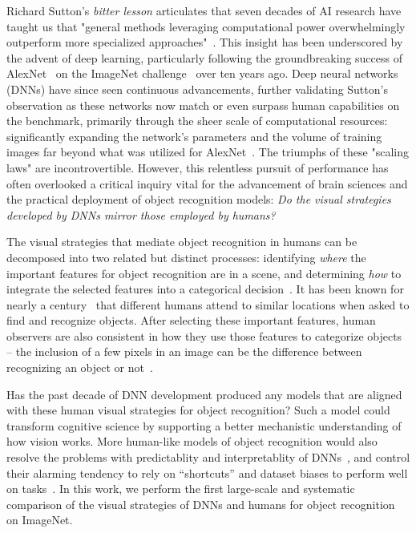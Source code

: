 


Richard Sutton's \textit{bitter lesson} articulates that seven decades of AI research have taught us that "general methods leveraging computational power overwhelmingly outperform more specialized approaches"~\cite{Sutton2019-vf}. This insight has been underscored by the advent of deep learning, particularly following the groundbreaking success of AlexNet~\cite{krizhevsky2012imagenet} on the ImageNet challenge~\cite{imagenet_cvpr09} over ten years ago. Deep neural networks (DNNs) have since seen continuous advancements, further validating Sutton's observation as these networks now match or even surpass human capabilities on the benchmark, primarily through the sheer scale of computational resources: significantly expanding the network's parameters and the volume of training images far beyond what was utilized for AlexNet~\cite{Liu2022-es,Zhai2021-al,Kaplan2020-zx}. The triumphs of these "scaling laws" are incontrovertible. However, this relentless pursuit of performance has often overlooked a critical inquiry vital for the advancement of brain sciences and the practical deployment of object recognition models: \textit{Do the visual strategies developed by DNNs mirror those employed by humans?}

The visual strategies that mediate object recognition in humans can be decomposed into two related but distinct processes: identifying \textit{where} the important features for object recognition are in a scene, and determining \textit{how} to integrate the selected features into a categorical decision~\cite{DiCarlo2012-nx, ullman2016atoms}. It has been known for nearly a century~\cite{Buswell1935-uu, Yarbus_undated-cq, Posner1980-hh, Mannan2009-xq} that different humans attend to similar locations when asked to find and recognize objects. After selecting these important features, human observers are also consistent in how they use those features to categorize objects -- the inclusion of a few pixels in an image can be the difference between recognizing an object or not~\cite{ullman2016atoms, Gruber2021-uq}.

Has the past decade of DNN development produced any models that are aligned with these human visual strategies for object recognition? Such a model could transform cognitive science by supporting a better mechanistic understanding of how vision works. More human-like models of object recognition would also resolve the problems with predictablity and interpretablity of DNNs~\cite{fel2021cannot}, and control their alarming tendency to rely on ``shortcuts'' and dataset biases to perform well on tasks~\cite{geirhos2020shortcut}. In this work, we perform the first large-scale and systematic comparison of the visual strategies of DNNs and humans for object recognition on ImageNet. 

